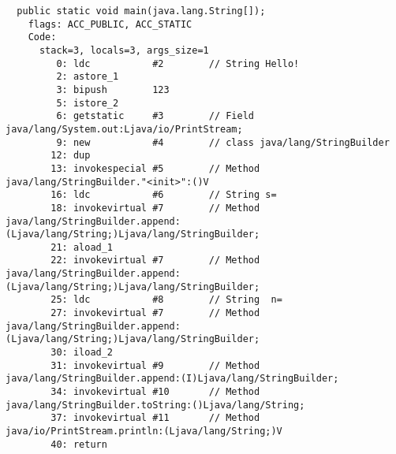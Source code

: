 \begin{lstlisting}
  public static void main(java.lang.String[]);
    flags: ACC_PUBLIC, ACC_STATIC
    Code:
      stack=3, locals=3, args_size=1
         0: ldc           #2        // String Hello!
         2: astore_1      
         3: bipush        123
         5: istore_2      
         6: getstatic     #3        // Field java/lang/System.out:Ljava/io/PrintStream;
         9: new           #4        // class java/lang/StringBuilder
        12: dup           
        13: invokespecial #5        // Method java/lang/StringBuilder."<init>":()V
        16: ldc           #6        // String s=
        18: invokevirtual #7        // Method java/lang/StringBuilder.append:(Ljava/lang/String;)Ljava/lang/StringBuilder;
        21: aload_1       
        22: invokevirtual #7        // Method java/lang/StringBuilder.append:(Ljava/lang/String;)Ljava/lang/StringBuilder;
        25: ldc           #8        // String  n=
        27: invokevirtual #7        // Method java/lang/StringBuilder.append:(Ljava/lang/String;)Ljava/lang/StringBuilder;
        30: iload_2       
        31: invokevirtual #9        // Method java/lang/StringBuilder.append:(I)Ljava/lang/StringBuilder;
        34: invokevirtual #10       // Method java/lang/StringBuilder.toString:()Ljava/lang/String;
        37: invokevirtual #11       // Method java/io/PrintStream.println:(Ljava/lang/String;)V
        40: return        
\end{lstlisting}
